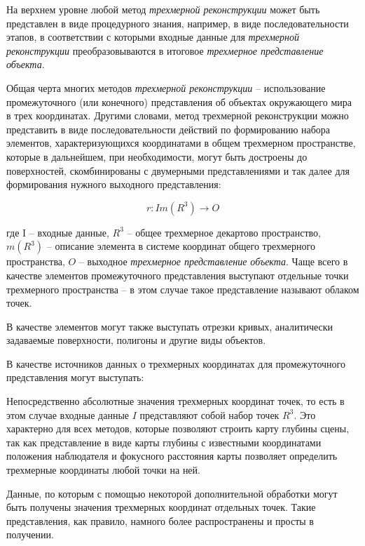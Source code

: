 На верхнем уровне любой метод \textit{трехмерной реконструкции} может быть представлен в виде процедурного знания, например, в виде последовательности этапов, в соответствии с которыми входные данные для \textit{трехмерной реконструкции} преобразовываются в итоговое \textit{трехмерное представление объекта}.

Общая черта многих методов \textit{трехмерной реконструкции} -- использование промежуточного (или конечного) представления об объектах окружающего мира в трех координатах. Другими словами, метод трехмерной реконструкции можно представить в виде последовательности действий по формированию набора элементов, характеризующихся координатами в общем трехмерном пространстве, которые в дальнейшем, при необходимости, могут быть достроены до поверхностей, скомбинированы с двумерными представлениями и так далее для формирования нужного выходного представления:

\begin{equation}
    r:I{m(R^3)}\rightarrow O
\end{equation}

где I -- входные данные, $R^3$ -- общее трехмерное декартово пространство, $m(R^3)$ -- описание элемента в системе координат общего трехмерного пространства, $O$ -- выходное \textit{трехмерное представление объекта}. Чаще всего в качестве элементов промежуточного представления выступают отдельные точки трехмерного пространства -- в этом случае такое представление называют облаком точек.

В качестве элементов могут также выступать отрезки кривых, аналитически задаваемые поверхности, полигоны и другие виды объектов.

В качестве источников данных о трехмерных координатах для промежуточного представления могут выступать:
\begin{textitemize}
    \item Непосредственно абсолютные значения трехмерных координат точек, то есть в этом случае входные данные $I$ представляют собой набор точек ${R^3}$. Это характерно для всех методов, которые позволяют строить карту глубины сцены, так как представление в виде карты глубины с известными координатами положения наблюдателя и фокусного расстояния карты позволяет определить трехмерные координаты любой точки на ней.
    \item Данные, по которым с помощью некоторой дополнительной обработки могут быть получены значения трехмерных координат отдельных точек. Такие представления, как правило, намного более распространены и просты в получении.
\end{textitemize}

